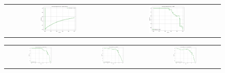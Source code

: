 \documentclass[pt]{article}  %
\begin{document}
\begin{figure}[H]
\begin{center}
\begin{tabular}{c c} %
    \includegraphics[width=0.35\textwidth]{prc-curve/nb.png} &
    \includegraphics[width=0.35\textwidth]{prc-curve/svm.png} \\
\end{tabular}

\vspace{5pt} %

\begin{tabular}{c c c} %
    \includegraphics[width=0.35\textwidth]{prc-curve/rf.png} &
    \includegraphics[width=0.35\textwidth]{prc-curve/ada.png} &
    \includegraphics[width=0.35\textwidth]{prc-curve/gb.png} \\
\end{tabular}


\end{center}
\end{figure}
\end{document}
